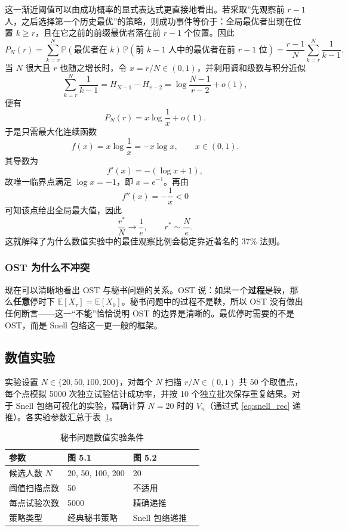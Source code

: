 这一渐近阈值可以由成功概率的显式表达式更直接地看出。若采取”先观察前 $r-1$ 人，之后选择第一个历史最优”的策略，则成功事件等价于：全局最优者出现在位置 $k\ge r$，且在它之前的前缀最优者落在前 $r-1$ 个位置。因此
\begin{equation}
  P_N(r)
  = \sum_{k=r}^{N} \mathbb{P}(\text{最优者在 } k)\,
    \mathbb{P}(\text{前 } k-1 \text{ 人中的最优者在前 } r-1 \text{ 位})
  = \frac{r-1}{N}\sum_{k=r}^{N}\frac{1}{k-1}.
\end{equation}
当 $N$ 很大且 $r$ 也随之增长时，令 $x=r/N\in(0,1)$，并利用调和级数与积分近似
\[
  \sum_{k=r}^{N}\frac{1}{k-1}
  = H_{N-1}-H_{r-2}
  = \log\frac{N-1}{r-2}+o(1),
\]
便有
\begin{equation}
  P_N(r) = x \log\frac{1}{x} + o(1).
\end{equation}
于是只需最大化连续函数
\[
  f(x)=x\log\frac{1}{x}=-x\log x,\qquad x\in(0,1).
\]
其导数为
\[
  f'(x)=-(\log x+1),
\]
故唯一临界点满足 $\log x=-1$，即 $x=e^{-1}$。再由
\[
  f''(x)=-\frac{1}{x}<0
\]
可知该点给出全局最大值，因此
\[
  \frac{r^*}{N}\to \frac{1}{e},
  \qquad
  r^* \sim \frac{N}{e}.
\]
这就解释了为什么数值实验中的最佳观察比例会稳定靠近著名的 $37\%$ 法则。

\subsubsection{OST 为什么不冲突}

现在可以清晰地看出 OST 与秘书问题的关系。OST 说：如果一个\textbf{过程}是鞅，那么\textbf{任意}停时下 $\mathbb{E}[X_\tau] = \mathbb{E}[X_0]$。秘书问题中的过程不是鞅，所以 OST 没有做出任何断言——这一``不能''恰恰说明 OST 的边界是清晰的。最优停时需要的不是 OST，而是 Snell 包络这一更一般的框架。

\subsection{数值实验}

实验设置 $N \in \{20, 50, 100, 200\}$，对每个 $N$ 扫描 $r/N \in (0, 1)$ 共 50 个取值点，每个点模拟 5000 次独立试验估计成功率，并按 10 个独立批次保存重复结果。对于 Snell 包络可视化的实验，精确计算 $N=20$ 时的 $V_n$（通过式 \eqref{eq:snell_rec} 递推）。各实验参数汇总于表~\ref{tab:secretary_params}。

\begin{table}[H]
  \centering
  \caption{秘书问题数值实验条件}
  \label{tab:secretary_params}
  \begin{tabular}{llll}
    \toprule
    参数 & 图 5.1 & 图 5.2 \\
    \midrule
    候选人数 $N$ & 20, 50, 100, 200 & 20 \\
    阈值扫描点数 & 50 & 不适用 \\
    每点试验次数 & 5000 & 精确递推 \\
    策略类型 & 经典秘书策略 & Snell 包络递推 \\
    \bottomrule
  \end{tabular}
\end{table}

